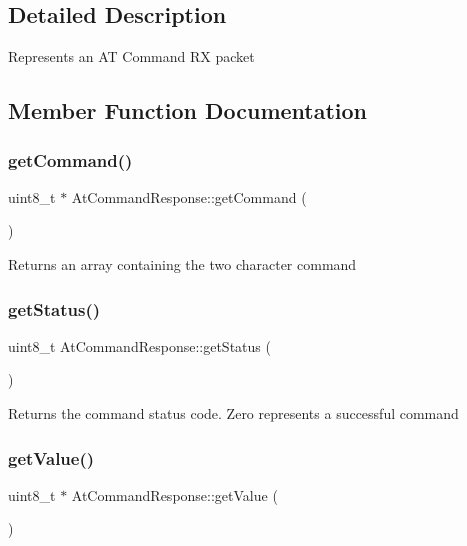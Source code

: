 \subsection{Detailed Description}
Represents an AT Command RX packet 

\subsection{Member Function Documentation}
\hypertarget{class_at_command_response_a20f1bf08ba77f2bc74f009318a6fd133}{}\label{class_at_command_response_a20f1bf08ba77f2bc74f009318a6fd133} 
\subsubsection{\texorpdfstring{get\+Command()}{getCommand()}}
{\footnotesize\ttfamily uint8\+\_\+t $\ast$ At\+Command\+Response\+::get\+Command (\begin{DoxyParamCaption}{ }\end{DoxyParamCaption})}

Returns an array containing the two character command \hypertarget{class_at_command_response_a340822cacf6eed3ef29955dc9610c09f}{}\label{class_at_command_response_a340822cacf6eed3ef29955dc9610c09f} 
\subsubsection{\texorpdfstring{get\+Status()}{getStatus()}}
{\footnotesize\ttfamily uint8\+\_\+t At\+Command\+Response\+::get\+Status (\begin{DoxyParamCaption}{ }\end{DoxyParamCaption})}

Returns the command status code. Zero represents a successful command \hypertarget{class_at_command_response_ad1e2a0b6f8988536c570b116f103e7f9}{}\label{class_at_command_response_ad1e2a0b6f8988536c570b116f103e7f9} 
\subsubsection{\texorpdfstring{get\+Value()}{getValue()}}
{\footnotesize\ttfamily uint8\+\_\+t $\ast$ At\+Command\+Response\+::get\+Value (\begin{DoxyParamCaption}{ }\end{DoxyParamCaption})}

